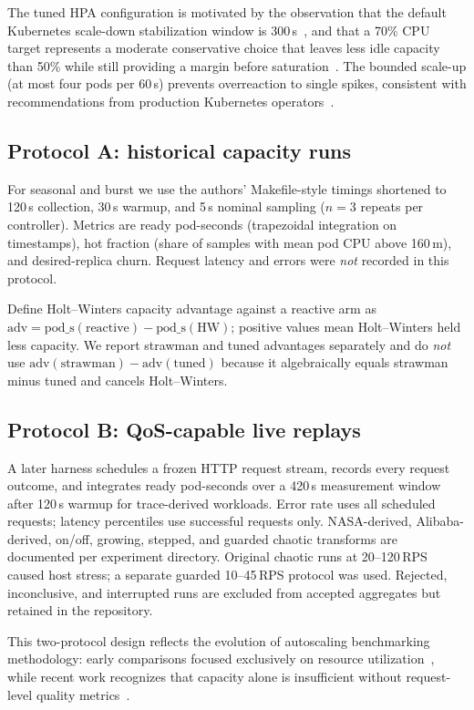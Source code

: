 \documentclass[journal]{IEEEtran}
\begin{document}
The tuned HPA configuration is motivated by the observation that the default Kubernetes scale-down stabilization window is 300\,s~\cite{nguyen2020}, and that a 70\% CPU target represents a moderate conservative choice that leaves less idle capacity than 50\% while still providing a margin before saturation~\cite{augustyn2024}. The bounded scale-up (at most four pods per 60\,s) prevents overreaction to single spikes, consistent with recommendations from production Kubernetes operators~\cite{rzadca2020}.

\subsection{Protocol A: historical capacity runs}
For seasonal and burst we use the authors' Makefile-style timings shortened to 120\,s collection, 30\,s warmup, and 5\,s nominal sampling ($n{=}3$ repeats per controller). Metrics are ready pod-seconds (trapezoidal integration on timestamps), hot fraction (share of samples with mean pod CPU above 160\,m), and desired-replica churn. Request latency and errors were \emph{not} recorded in this protocol.

Define Holt--Winters capacity advantage against a reactive arm as $\mathrm{adv}=\mathrm{pod\_s}(\mathrm{reactive})-\mathrm{pod\_s}(\mathrm{HW})$; positive values mean Holt--Winters held less capacity. We report strawman and tuned advantages separately and do \emph{not} use $\mathrm{adv}(\mathrm{strawman})-\mathrm{adv}(\mathrm{tuned})$ because it algebraically equals strawman minus tuned and cancels Holt--Winters.

\subsection{Protocol B: QoS-capable live replays}
A later harness schedules a frozen HTTP request stream, records every request outcome, and integrates ready pod-seconds over a 420\,s measurement window after 120\,s warmup for trace-derived workloads. Error rate uses all scheduled requests; latency percentiles use successful requests only. NASA-derived, Alibaba-derived, on/off, growing, stepped, and guarded chaotic transforms are documented per experiment directory. Original chaotic runs at 20--120\,RPS caused host stress; a separate guarded 10--45\,RPS protocol was used. Rejected, inconclusive, and interrupted runs are excluded from accepted aggregates but retained in the repository.

This two-protocol design reflects the evolution of autoscaling benchmarking methodology: early comparisons focused exclusively on resource utilization~\cite{lorido2014}, while recent work recognizes that capacity alone is insufficient without request-level quality metrics~\cite{mogul2019, mca2026}.
\end{document}
